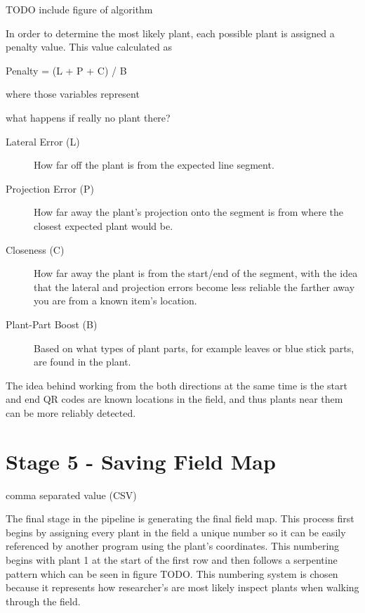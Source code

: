 TODO include figure of algorithm

In order to determine the most likely plant, each possible plant is assigned a penalty value.  This value calculated as

Penalty = (L + P + C) / B

where those variables represent

what happens if really no plant there?

\begin{description}
\item[Lateral Error (L)] How far off the plant is from the expected line segment.
\item[Projection Error (P)] How far away the plant's projection onto the segment is from where the closest expected plant would be.
\item[Closeness (C)] How far away the plant is from the start/end of the segment, with the idea that the lateral and projection errors become less reliable the farther away you are from a known item's location.
\item[Plant-Part Boost (B)] Based on what types of plant parts, for example leaves or blue stick parts, are found in the plant.
\end{description}

The idea behind working from the both directions at the same time is the start and end QR codes are known locations in the field, and thus plants near them can be more reliably detected. 

\section{Stage 5 - Saving Field Map}
\label{processing-stage5}

comma separated value (CSV)

The final stage in the pipeline is generating the final field map.  This process first begins by assigning every plant in the field a unique number so it can be easily referenced by another program using the plant's coordinates.  This numbering begins with plant 1 at the start of the first row and then follows a serpentine pattern which can be seen in figure TODO.  This numbering system is chosen because it represents how researcher's are most likely inspect plants when walking through the field.  


